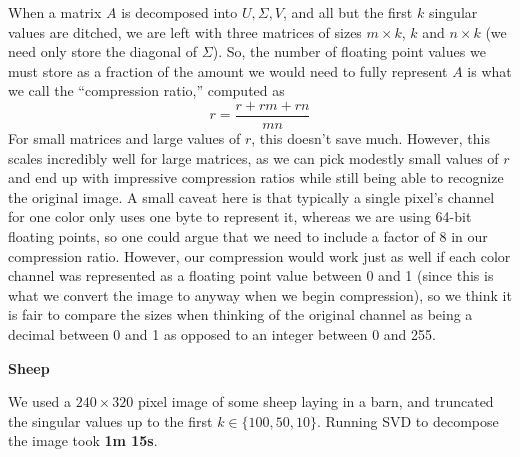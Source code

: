 When a matrix $A$ is decomposed into $U, \Sigma, V$, and all but the first $k$ singular values are ditched, we are 
left with three matrices of sizes $m \times k$, $k$ and $n \times k$ (we need only store the diagonal of $\Sigma$).
So, the number of floating point values we must store as a fraction of the amount we would need to fully represent 
$A$ is what we call the ``compression ratio,'' computed as 
\[
    r = \frac{r + rm + rn}{mn}
\]
For small matrices and large values of $r$, this doesn't save much. However, this scales incredibly well for large matrices, 
as we can pick modestly small values of $r$ and end up with impressive compression ratios while still being able to recognize 
the original image. A small caveat here is that typically a single pixel's channel for one color only uses one byte to 
represent it, whereas we are using 64-bit floating points, so one could argue that we need to include a factor of 8 
in our compression ratio. However, our compression would work just as well if each color channel was represented 
as a floating point value between 0 and 1 (since this is what we convert the image to anyway when we begin 
compression), so we think it is fair to compare the sizes when thinking of the original channel as being a 
decimal between 0 and 1 as opposed to an integer between 0 and 255.

\begin{center}
    \textbf{Sheep}
\end{center}

We used a $240 \times 320$ pixel image of some sheep laying in a barn, and truncated the singular values
up to the first $k \in \{100, 50, 10\}$. Running SVD to decompose the image took \textbf{1m 15s}.

